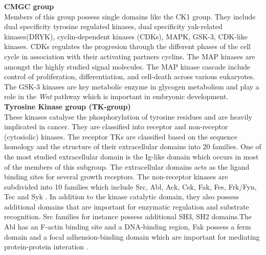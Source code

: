 \documentclass[a4paper, 11pt]{article}
\begin{document}
\textbf{CMGC group}\\
Members of this group possess single domains like the CK1 group. They include dual specificity tyrosine regulated kinases, dual specificity yak-related kinases(DRYK), cyclin-dependent kinases (CDKs), MAPK, GSK-3, CDK-like kinases. CDKs regulates the progresion through the different phases of the cell cycle in association with their activating partners cyclins. The MAP kinases are amongst the highly studied signal molecules. The MAP kinase cascade include control of proliferation, differentiation, and cell-death across various eukaryotes. The GSK-3 kinases are key metabolic enzyme in glycogen metabolism and play a role in the \textit{Wnt} pathway which is important in embryonic development. \\

\textbf{Tyrosine Kinase group (TK-group)}\\
These kinases catalyse the phosphorylation of tyrosine residues and are heavily implicated in cancer. They are classified into receptor and non-receptor (cytosiolic) kinases. The receptor TKs are classified based on the sequence homology and the structure of their extracellular domains into 20 families. One of the most studied extracellular domain is the Ig-like domain which occurs in most of the members of this subgroup. The extracellular domains acts as the ligand binding sites for several growth receptors. The non-receptor kinases are subdivided into 10 families which include Src, Abl, Ack, Csk, Fak, Fes, Frk/Fyn, Tec and Syk \cite{rakshambikai2015typical}. In addition to the kinase catalytic domain, they also possess additional domains that are important for enzymatic regulation and substrate recognition. Src families for instance possess additional SH3, SH2 domains.The Abl has an F-actin binding site and a DNA-binding region, Fak possess a ferm domain and a focal adhension-binding domain which are important for mediating protein-protein interation \cite{duong2013human,rakshambikai2015typical}.\\
\end{document}
